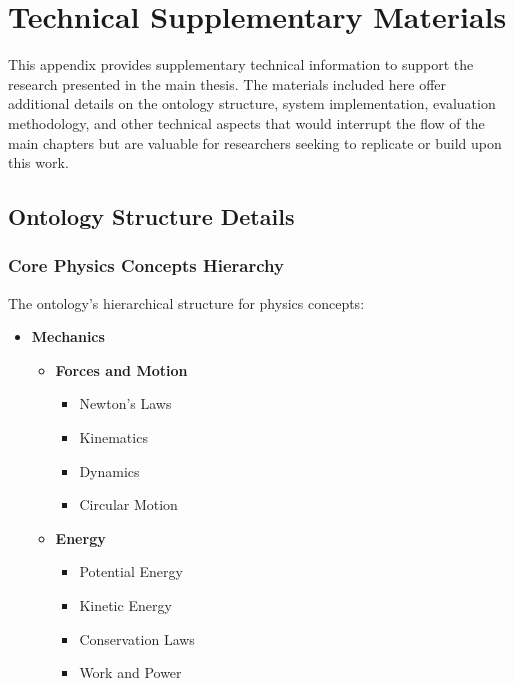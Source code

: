 \chapter{Technical Supplementary Materials}
\label{app:technical-materials}

This appendix provides supplementary technical information to support the research presented in the main thesis. The materials included here offer additional details on the ontology structure, system implementation, evaluation methodology, and other technical aspects that would interrupt the flow of the main chapters but are valuable for researchers seeking to replicate or build upon this work.

\section{Ontology Structure Details}
\label{sec:ontology-structure}

\subsection{Core Physics Concepts Hierarchy}
The ontology's hierarchical structure for physics concepts:

\begin{itemize}
    \item \textbf{Mechanics}
        \begin{itemize}
            \item \textbf{Forces and Motion}
                \begin{itemize}
                    \item Newton's Laws
                    \item Kinematics
                    \item Dynamics
                    \item Circular Motion
                \end{itemize}
            \item \textbf{Energy}
                \begin{itemize}
                    \item Potential Energy
                    \item Kinetic Energy
                    \item Conservation Laws
                    \item Work and Power
                \end{itemize}
        \end{itemize}
\end{itemize}

